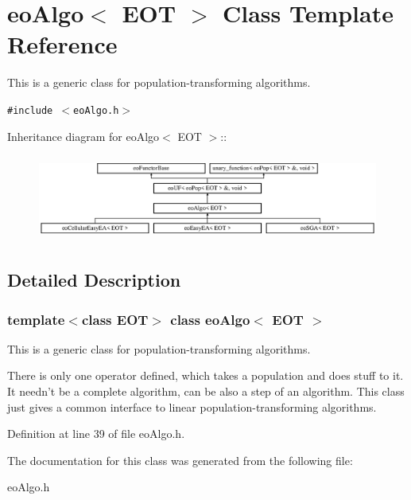 \section{eo\-Algo$<$ EOT $>$ Class Template Reference}
\label{classeo_algo}
This is a generic class for population-transforming algorithms.  


{\tt \#include $<$eo\-Algo.h$>$}

Inheritance diagram for eo\-Algo$<$ EOT $>$::\begin{figure}[H]
\begin{center}
\leavevmode
\includegraphics[height=2.86079cm]{classeo_algo}
\end{center}
\end{figure}


\subsection{Detailed Description}
\subsubsection*{template$<$class EOT$>$ class eo\-Algo$<$ EOT $>$}

This is a generic class for population-transforming algorithms. 

There is only one operator defined, which takes a population and does stuff to it. It needn't be a complete algorithm, can be also a step of an algorithm. This class just gives a common interface to linear population-transforming algorithms. 



Definition at line 39 of file eo\-Algo.h.

The documentation for this class was generated from the following file:\begin{CompactItemize}
\item 
eo\-Algo.h\end{CompactItemize}
